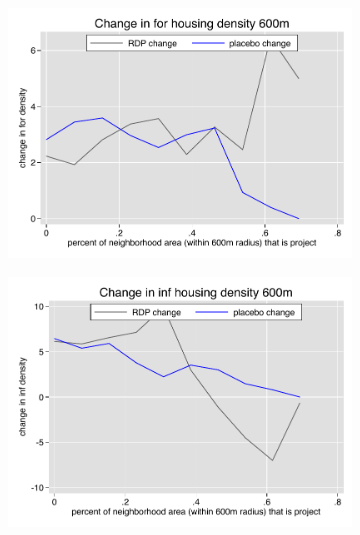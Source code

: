 \documentclass[12pt]{article}
\begin{document}
\begin{figure}
        \vspace{-6mm}
        \begin{subfigure}[b]{0.495\textwidth}
            \centering
            \includegraphics[width=\textwidth,trim={0.3cm .3cm 0.1cm 0cm}, clip=true]{figures/change_for_600_local.pdf}
        \end{subfigure}
        \hfill
        \begin{subfigure}[b]{0.495\textwidth}  
            \centering 
            \includegraphics[width=\textwidth,trim={0.3cm .3cm 0.1cm 0cm}, clip=true]{figures/change_inf_600_local.pdf}
        \end{subfigure}
        \vspace{-6mm}
    \end{figure} 
\end{document}
